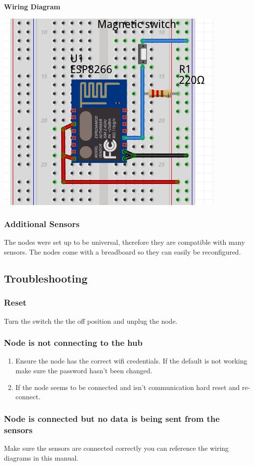       \textbf{Wiring Diagram}\\
      \begin{center}
        \includegraphics[scale=0.25]{images/door-cir.png}
        \end{center}
    \subsubsection{Additional Sensors}
      The nodes were set up to be universal, therefore they are compatible with
      many sensors. The nodes come with a breadboard so they can
      easily be reconfigured.\\
\newpage
  \subsection{Troubleshooting}
  \subsubsection{Reset}
  Turn the switch the the off position and unplug the node.
  \subsubsection{Node is not connecting to the hub}
  \begin{enumerate}
    \item Ensure the node has the correct wifi credentials. If the default is not
    working make sure the password hasn't been changed.
    \item If the node seems to be connected and isn't communication hard reset and re-connect.
  \end{enumerate}
  \subsubsection{Node is connected but no data is being sent from the sensors}
  Make sure the sensors are connected correctly you can reference the wiring diagrams
  in this manual.

